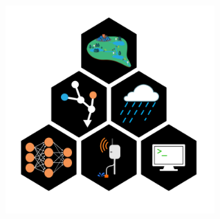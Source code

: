 \begin{titlepage}
    \begin{addmargin}[-1cm]{-3cm}
    \begin{center}
        \large

        \hfill

        \vfill

        \begingroup
            \color{CTtitle}\spacedallcaps{\myTitle} \\ \bigskip
        \endgroup

        \spacedlowsmallcaps{\myName}

        \vfill

        \includegraphics[width=8cm]{gfx/title_page.png} \\ \medskip


	\myFaculty\\
	\mySupervisor\\
	\myProf \\
	\myOtherProf \\

	\medskip
        \myDegree \\
        \myDepartment \\
        \myUni \\ \bigskip

        \vfill

    \end{center}
  \end{addmargin}
\end{titlepage}
